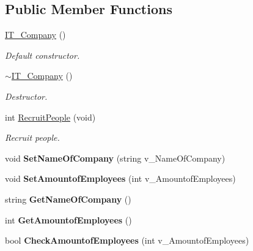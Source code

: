 \subsection*{Public Member Functions}
\begin{DoxyCompactItemize}
\item 
\mbox{\label{class_i_t___company_a13bea9468214205bd5b4b57c6174de9a}} 
\hyperlink{class_i_t___company_a13bea9468214205bd5b4b57c6174de9a}{I\+T\+\_\+\+Company} ()
\begin{DoxyCompactList}\small\item\em Default constructor. \end{DoxyCompactList}\item 
\mbox{\label{class_i_t___company_aacbb3e9ae0d6d8a41a25785484cfc05f}} 
\hyperlink{class_i_t___company_aacbb3e9ae0d6d8a41a25785484cfc05f}{$\sim$\+I\+T\+\_\+\+Company} ()
\begin{DoxyCompactList}\small\item\em Destructor. \end{DoxyCompactList}\item 
\mbox{\label{class_i_t___company_a2753c0f3da2fb8aee6a48b3ebe3bef79}} 
int \hyperlink{class_i_t___company_a2753c0f3da2fb8aee6a48b3ebe3bef79}{Recruit\+People} (void)
\begin{DoxyCompactList}\small\item\em Recruit people. \end{DoxyCompactList}\item 
\mbox{\label{class_i_t___company_a652c409e38a609c96e788be7687ab744}} 
void {\bfseries Set\+Name\+Of\+Company} (string v\+\_\+\+Name\+Of\+Company)
\item 
\mbox{\label{class_i_t___company_a918bdfd512ef8267cf082a20e86a63e9}} 
void {\bfseries Set\+Amountof\+Employees} (int v\+\_\+\+Amountof\+Employees)
\item 
\mbox{\label{class_i_t___company_addd5ab4a8699d8df60fd2cd00a4f9875}} 
string {\bfseries Get\+Name\+Of\+Company} ()
\item 
\mbox{\label{class_i_t___company_ad5210ab4e6ef0a7c9b218678645410e4}} 
int {\bfseries Get\+Amountof\+Employees} ()
\item 
\mbox{\label{class_i_t___company_a8214142064b5b8f6fed854b45f83a2aa}} 
bool {\bfseries Check\+Amountof\+Employees} (int v\+\_\+\+Amountof\+Employees)
\end{DoxyCompactItemize}
